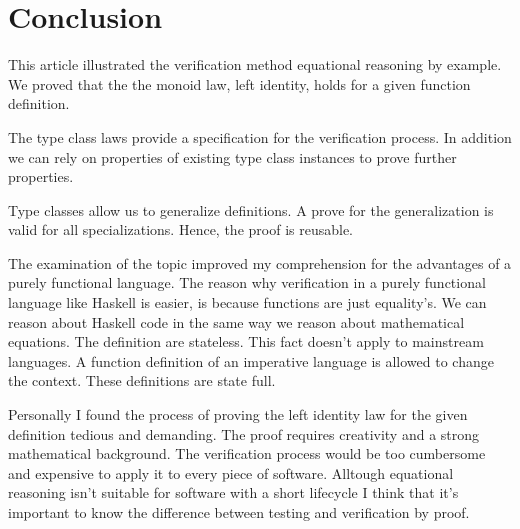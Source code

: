 
\section{Conclusion}

This article illustrated the verification method equational reasoning by example. We proved that the the monoid law, left identity, holds for a given function definition. 

The type class laws provide a specification for the verification process. In addition we can rely on properties of existing type class instances to prove further properties.

Type classes allow us to generalize definitions. A prove for the generalization is valid for all specializations. Hence, the proof is reusable.

The examination of the topic improved my comprehension for the advantages of a purely functional language. The reason why verification in a purely functional language like Haskell is easier, is because functions are just equality's. We can reason about Haskell code in the same way we reason about mathematical equations. The definition are stateless. This fact doesn't apply to mainstream languages. A function definition of an imperative language is allowed to change the context. These definitions are state full.

Personally I found the process of proving the left identity law for the given definition tedious and demanding. The proof requires creativity and a strong mathematical background. The verification process would be too cumbersome and expensive to apply it to every piece of software. Alltough equational reasoning  isn't suitable for software with a short lifecycle I think that it's important to know the difference between testing and verification by proof.
